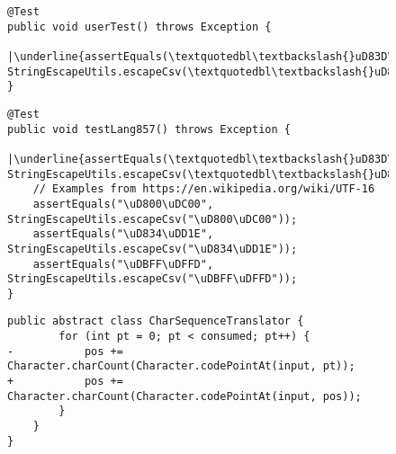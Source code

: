 \documentclass[manuscript, review, screen]{acmart}
\begin{document}
\begin{figure}[t]
\begin{minipage}{\linewidth}
\begin{verbatim}
@Test
public void userTest() throws Exception {
    |\underline{assertEquals(\textquotedbl\textbackslash{}uD83D\textbackslash{}uDE30\textquotedbl,\ StringEscapeUtils.escapeCsv(\textquotedbl\textbackslash{}uD83D\textbackslash{}uDE30\textquotedbl));}|
}
\end{verbatim}
\vspace*{-6pt}
\label{fig:motivating-user}
\end{minipage}

\bigskip

\begin{minipage}{\linewidth}
{
\begin{verbatim}
@Test
public void testLang857() throws Exception {
    |\underline{assertEquals(\textquotedbl\textbackslash{}uD83D\textbackslash{}uDE30\textquotedbl,\ StringEscapeUtils.escapeCsv(\textquotedbl\textbackslash{}uD83D\textbackslash{}uDE30\textquotedbl));}|
    // Examples from https://en.wikipedia.org/wiki/UTF-16
    assertEquals("\uD800\uDC00", StringEscapeUtils.escapeCsv("\uD800\uDC00"));
    assertEquals("\uD834\uDD1E", StringEscapeUtils.escapeCsv("\uD834\uDD1E"));
    assertEquals("\uDBFF\uDFFD", StringEscapeUtils.escapeCsv("\uDBFF\uDFFD"));
}
\end{verbatim}
}
\vspace*{-6pt}
\label{fig:motivating-dev}
\end{minipage}

\bigskip

\begin{minipage}{\linewidth}
{
\renewcommand\theFancyVerbLine{%
\ifnum\value{FancyVerbLine}=467
  \setcounter{FancyVerbLine}{475}\rmfamily \tiny \vdots
\else
\rmfamily \tiny \arabic{FancyVerbLine}%
\fi
}
\begin{verbatim}
public abstract class CharSequenceTranslator {
        for (int pt = 0; pt < consumed; pt++) {
-           pos += Character.charCount(Character.codePointAt(input, pt));
+           pos += Character.charCount(Character.codePointAt(input, pos));
        }
    }
}
\end{verbatim}
}
\vspace*{-6pt}
\label{fig:motivating-fix}
\end{minipage}
\end{figure}





\end{document}
